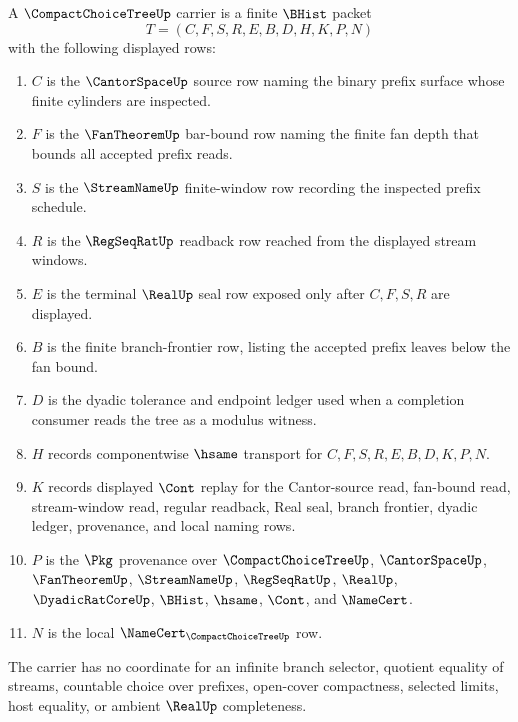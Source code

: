 \begin{definition}
\label{def:compact-choice-tree-carrier}
A $\CompactChoiceTreeUp$ carrier is a finite $\BHist$ packet
$$
T=(C,F,S,R,E,B,D,H,K,P,N)
$$
with the following displayed rows:
\begin{enumerate}
\item $C$ is the $\CantorSpaceUp$ source row naming the binary prefix surface whose finite cylinders are inspected.
\item $F$ is the $\FanTheoremUp$ bar-bound row naming the finite fan depth that bounds all accepted prefix reads.
\item $S$ is the $\StreamNameUp$ finite-window row recording the inspected prefix schedule.
\item $R$ is the $\RegSeqRatUp$ readback row reached from the displayed stream windows.
\item $E$ is the terminal $\RealUp$ seal row exposed only after $C,F,S,R$ are displayed.
\item $B$ is the finite branch-frontier row, listing the accepted prefix leaves below the fan bound.
\item $D$ is the dyadic tolerance and endpoint ledger used when a completion consumer reads the tree as a modulus witness.
\item $H$ records componentwise $\hsame$ transport for $C,F,S,R,E,B,D,K,P,N$.
\item $K$ records displayed $\Cont$ replay for the Cantor-source read, fan-bound read, stream-window read, regular readback, Real seal, branch frontier, dyadic ledger, provenance, and local naming rows.
\item $P$ is the $\Pkg$ provenance over $\CompactChoiceTreeUp$, $\CantorSpaceUp$, $\FanTheoremUp$, $\StreamNameUp$, $\RegSeqRatUp$, $\RealUp$, $\DyadicRatCoreUp$, $\BHist$, $\hsame$, $\Cont$, and $\NameCert$.
\item $N$ is the local $\NameCert_{\CompactChoiceTreeUp}$ row.
\end{enumerate}
The carrier has no coordinate for an infinite branch selector, quotient equality of streams, countable choice over prefixes, open-cover compactness, selected limits, host equality, or ambient $\RealUp$ completeness.
\end{definition}

